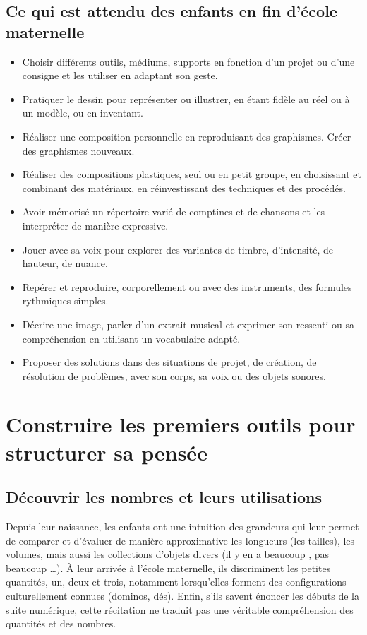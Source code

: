 \section{Ce qui est attendu des enfants en fin d’école maternelle}
\begin{itemize}
\item Choisir différents outils, médiums, supports en fonction d’un projet ou d’une consigne et les utiliser en adaptant son geste.
\item Pratiquer le dessin pour représenter ou illustrer, en étant fidèle au réel ou à un modèle, ou en inventant. 
\item Réaliser une composition personnelle en reproduisant des graphismes. Créer des graphismes nouveaux.
\item Réaliser des compositions plastiques, seul ou en petit groupe, en choisissant et combinant des matériaux, en réinvestissant des techniques et des procédés.
\item Avoir mémorisé un répertoire varié de comptines et de chansons et les interpréter de manière expressive. 
\item Jouer avec sa voix pour explorer des variantes de timbre, d’intensité, de hauteur, de nuance. 
\item Repérer et reproduire, corporellement ou avec des instruments, des formules rythmiques simples. 
\item Décrire une image, parler d’un extrait musical et exprimer son ressenti ou sa compréhension en utilisant un vocabulaire adapté.
\item Proposer des solutions dans des situations de projet, de création, de résolution de problèmes, avec son corps, sa voix ou des objets sonores.
\end{itemize}

\chapter{Construire les premiers outils pour structurer sa pensée}
\section{Découvrir les nombres et leurs utilisations}
Depuis leur naissance, les enfants ont une intuition des grandeurs qui leur permet de comparer et d’évaluer de manière approximative les longueurs (les tailles), les volumes, mais aussi les collections d’objets divers (\og il y en a beaucoup \fg{}, \og pas beaucoup \fg{}\dots). À leur arrivée à l’école maternelle, ils discriminent les petites quantités, un, deux et trois, notamment lorsqu’elles forment des configurations culturellement connues (dominos, dés). Enfin, s’ils savent énoncer les débuts de la suite numérique, cette récitation ne traduit pas une véritable compréhension des quantités et des nombres. 

